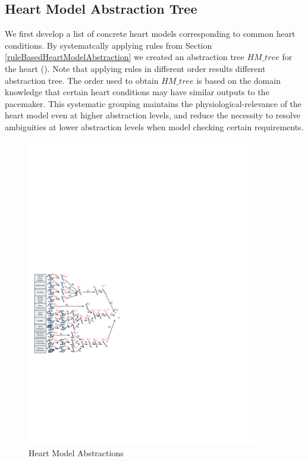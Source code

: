 \subsection{Heart Model Abstraction Tree}
We first develop a list of concrete heart models corresponding to common heart conditions. By systematcally applying rules from Section \ref{ruleBasedHeartModelAbstraction} we created an abstraction tree $HM\_tree$ for the heart (). Note that applying rules in different order results different abstraction tree. The order used to obtain $HM\_tree$ is based on the domain knowledge that certain heart conditions may have similar outputs to the pacemaker. This systematic grouping maintains the physiological-relevance of the heart model even at higher abstraction levels, and reduce the necessity to resolve ambiguities at lower abstraction levels when model checking certain requirements.
\begin{figure}[!t]
		\centering
		\includegraphics[width=0.9\textwidth]{figs/abs.pdf}
		\caption{\small Heart Model Abstractions}
		\label{fig:HM_abs}
\end{figure}

